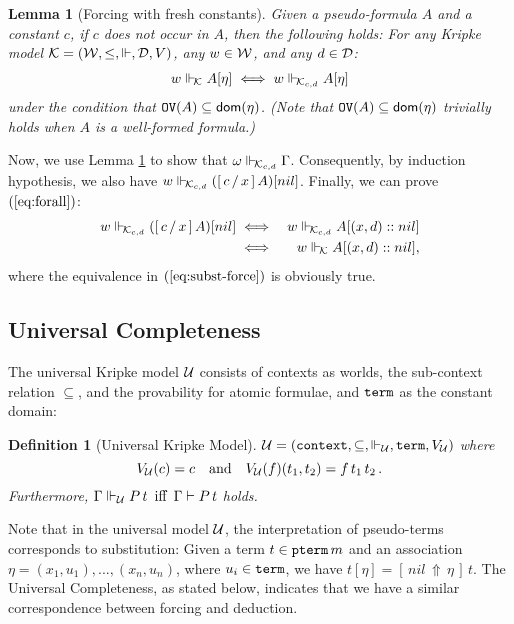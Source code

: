 \documentclass{svjour3}                     %
\newtheorem{lem}[thm]{Lemma}
\newtheorem{defi}[thm]{Definition}
\newcommand{\cald}{{\cal D}}
\newcommand{\calk}{{\cal K}}
\newcommand{\calu}{{\cal U}}
\newcommand{\calw}{{\cal W}}
\newcommand{\Ga}{\Gamma}
\newcommand{\om}{\omega}
\newcommand{\vd}{\vdash}
\newcommand{\Vd}{\Vdash}
\newcommand{\substa}[3]{[\,#3\, \Uparrow\, #2\,]\, #1}
\newcommand{\substs}[3]{[\, #3\, \slash\, #2\,]\, #1}
\newcommand{\tm}{\subseteq}
\newcommand{\dom}{\mathrm{\textsf{dom}}}
\newcommand{\tpterm}{\textup{\tt pterm}}
\newcommand{\tterm}{\textup{\tt term}}
\newcommand{\tcontext}{\textup{\tt context}}
\newcommand{\tPH}{\textup{\tt OV}}
\begin{document}
\begin{lem}[Forcing with fresh constants]\label{create-kripke}
  Given a pseudo-formula $A$ and a constant $c$, if $c$ does not occur
  in $A$, then the following holds: For any Kripke model $\calk = (\calw,
  \le, \Vd, \cald, V)$, any $w \in \calw$, and any $d \in \cald$:
  \begin{eqnarray*}
    w \Vd_{\!\calk} A [\eta] \iff w \Vd_{\!\calk_{c,d}} A [\eta]
  \end{eqnarray*}
under the condition that $\tPH (A) \tm \dom (\eta)$. (Note that $\tPH (A) \tm \dom (\eta)$ trivially holds when $A$ is a well-formed formula.)
\end{lem}

Now, we use Lemma \ref{create-kripke} to show that $\om
\Vd_{\!\calk_{c,d}} \Ga$. Consequently,  by induction hypothesis, we
also have $w \Vd_{\!\calk_{c,d}} (\substs{A}{x}{c}) [nil]$. Finally, we
can prove $(\ref{eq:forall})$:
\begin{eqnarray}
  w \Vd_{\!\calk_{c,d}} (\substs{A}{x}{c}) [nil] & \iff & w \Vd_{\!\calk_{c,d}} A [(x,d)::nil] \label{eq:subst-force}\\
  & \iff & w \Vd_{\!\calk} A [(x,d)::nil], \nonumber
\end{eqnarray}
where the equivalence in $(\ref{eq:subst-force})$ is obviously true.

\subsection{Universal Completeness}
The universal Kripke model $\calu$ consists of contexts as worlds, the sub-context relation $\tm$, and the provability for atomic formulae, and $\tterm$ as the constant domain:

\begin{defi}[Universal Kripke Model]\label{def:universal}
$\calu = (\tcontext, \subseteq, \Vd_\calu, \tterm, V_\calu)$ where
  \[
  V_\calu(c) = c \quad\text{and}\quad V_\calu(f)(t_1, t_2) = f\, t_1\, t_2\, .
  \]
Furthermore, $\Ga \Vd_\calu P\, t \text{ \,iff\, } \Ga \vd P\,t$ holds.
\end{defi}

Note that in the universal model $\calu$, the interpretation of
pseudo-terms corresponds to substitution: Given a term $t \in\tpterm \, m$ and an association $\eta = (x_1,u_1),...,(x_n, u_n)$, where $u_i \in \tterm$, we have
$t[\eta] = \substa{t}{\eta}{nil}$. The Universal Completeness, as stated
below, indicates that we have a similar correspondence between forcing and deduction.
\end{document}

